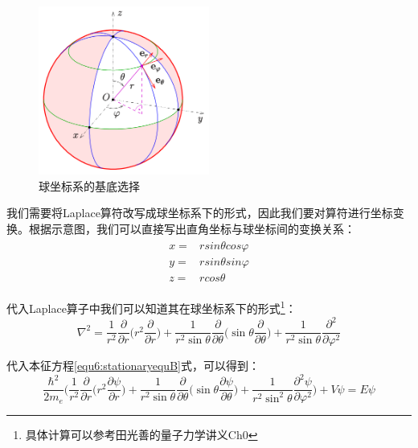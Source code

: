         \begin{figure}[H]
            \centering
            \includegraphics[width=0.5\textwidth]{figure/sphere.png}
            \caption{球坐标系的基底选择}
            \label{fig:spherecoordinate}
        \end{figure}
        
        我们需要将Laplace算符改写成球坐标系下的形式，因此我们要对算符进行坐标变换。根据示意图，我们可以直接写出直角坐标与球坐标间的变换关系：
        \begin{align}
            \begin{split}
                x=&rsin\theta cos\varphi\\
                y=&rsin\theta sin\varphi\\
                z=&rcos\theta
            \end{split}
        \end{align}
        
        代入Laplace算子中我们可以知道其在球坐标系下的形式\footnote{具体计算可以参考田光善的量子力学讲义Ch0}：
        \begin{equation}
            \nabla^2=\frac{1}{r^2}\frac{\partial}{\partial r}\Big(r^2\frac{\partial}{\partial  r}\Big)+\frac{1}{r^2\sin{\theta}}\frac{\partial}{\partial \theta}\Big(\sin{\theta}\frac{\partial}{\partial \theta}\Big)+\frac{1}{r^2\sin{\theta}}\frac{\partial^2}{\partial\varphi^2}
        \end{equation}
        
        代入本征方程\ref{equ6:stationaryequB}式，可以得到：
        \begin{equation}
            \frac{\hbar^2}{2m_e}\Big(\frac{1}{r^2}\frac{\partial}{\partial r}\Big(r^2\frac{\partial\psi}{\partial  r}\Big)+\frac{1}{r^2\sin{\theta}}\frac{\partial}{\partial \theta}\Big(\sin{\theta}\frac{\partial\psi}{\partial \theta}\Big)+\frac{1}{r^2\sin^2{\theta}}\frac{\partial^2\psi}{\partial\varphi^2}\Big)+V\psi =E\psi
        \end{equation}
        
